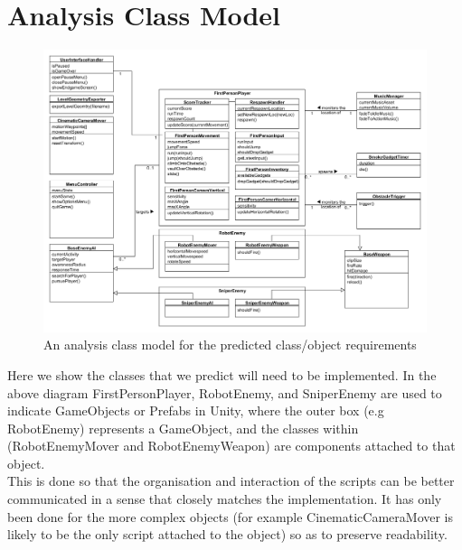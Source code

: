 \documentclass[a4paper,10pt]{article}
\begin{document}
\section{Analysis Class Model}
\begin{figure}[H]
	\begin{center}
		\includegraphics[scale=0.4]{images/AnalysisClassDiagram.png}
		\caption{An analysis class model for the predicted class/object requirements}
	\end{center}
\end{figure}
Here we show the classes that we predict will need to be implemented. In the above diagram FirstPersonPlayer, RobotEnemy, and SniperEnemy are used to indicate GameObjects or Prefabs in Unity, where the outer box (e.g RobotEnemy) represents a GameObject, and the classes within (RobotEnemyMover and RobotEnemyWeapon) are components attached to that object. \\
This is done so that the organisation and interaction of the scripts can be better communicated in a sense that closely matches the implementation. It has only been done for the more complex objects (for example CinematicCameraMover is likely to be the only script attached to the object) so as to preserve readability.
\end{document}
